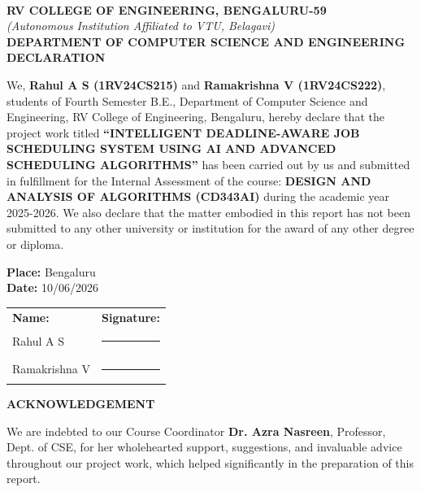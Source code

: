 \documentclass[12pt,a4paper]{article}
\begin{document}
\newpage

\thispagestyle{empty}
\begin{center}
    \large
    \textbf{RV COLLEGE OF ENGINEERING\textsuperscript{\textregistered}, BENGALURU-59}\\
    \textit{(Autonomous Institution Affiliated to VTU, Belagavi)}\\
    \textbf{DEPARTMENT OF COMPUTER SCIENCE AND ENGINEERING}\\
    \vspace{1cm}
    \Large
    \textbf{DECLARATION}\\
    \vspace{1cm}
\end{center}
\noindent
We, \textbf{Rahul A S (1RV24CS215)} and \textbf{Ramakrishna V (1RV24CS222)}, students of Fourth Semester B.E., Department of Computer Science and Engineering, RV College of Engineering, Bengaluru, hereby declare that the project work titled \textbf{``INTELLIGENT DEADLINE-AWARE JOB SCHEDULING SYSTEM USING AI AND ADVANCED SCHEDULING ALGORITHMS''} has been carried out by us and submitted in fulfillment for the Internal Assessment of the course: \textbf{DESIGN AND ANALYSIS OF ALGORITHMS (CD343AI)} during the academic year 2025-2026. We also declare that the matter embodied in this report has not been submitted to any other university or institution for the award of any other degree or diploma.

\vspace{1.5cm}
\noindent
\textbf{Place:} Bengaluru \\
\textbf{Date:} 10/06/2026

\vspace{2.5cm}
\noindent
\begin{tabular}{p{7cm}p{7cm}}
    \textbf{Name:} & \textbf{Signature:} \\
    Rahul A S & \rule{5cm}{0.4pt} \\
    Ramakrishna V & \rule{5cm}{0.4pt}
\end{tabular}

\newpage

\thispagestyle{empty}
\begin{center}
    \Large
    \textbf{ACKNOWLEDGEMENT}\\
    \vspace{1cm}
\end{center}
\noindent
We are indebted to our Course Coordinator \textbf{Dr. Azra Nasreen}, Professor, Dept. of CSE, for her wholehearted support, suggestions, and invaluable advice throughout our project work, which helped significantly in the preparation of this report.
\end{document}
